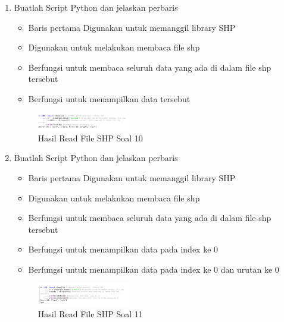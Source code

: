 \begin{enumerate}
    \item Buatlah Script Python dan jelaskan perbaris
    
    \hfill\break
    \begin{itemize}
        \item Baris pertama Digunakan untuk memanggil library SHP
        \item Digunakan untuk melakukan membaca file shp
        \item Berfungsi untuk membaca seluruh data yang ada di dalam file shp tersebut
        \item Berfungsi untuk menampilkan data tersebut
    \end{itemize}  
    \hfill\break
    \begin{figure}[H]
		\includegraphics[width=4cm]{figures/1174021/3/soal10.PNG}
		\centering
		\caption{Hasil Read File SHP Soal 10}
    \end{figure}

    \item Buatlah Script Python dan jelaskan perbaris
    
    \hfill\break
    \begin{itemize}
        \item Baris pertama Digunakan untuk memanggil library SHP
        \item Digunakan untuk melakukan membaca file shp
        \item Berfungsi untuk membaca seluruh data yang ada di dalam file shp tersebut
        \item Berfungsi untuk menampilkan data pada index ke 0
        \item Berfungsi untuk menampilkan data pada index ke 0 dan urutan ke 0
    \end{itemize}  
    \hfill\break
    \begin{figure}[H]
        \includegraphics[width=4cm]{figures/1174021/3/soal11.PNG}
        \centering
        \caption{Hasil Read File SHP Soal 11}
    \end{figure}
\end{enumerate}

